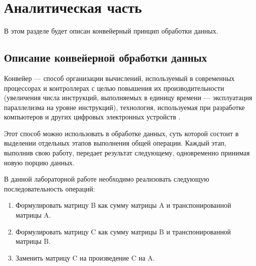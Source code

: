 \chapter{Аналитическая часть}
В этом разделе будет описан конвейерный принцип обработки данных.

\section{Описание конвейерной обработки данных}

Конвейер — способ организации вычислений, используемый в современных процессорах и контроллерах с целью повышения их производительности (увеличения числа инструкций, выполняемых в единицу времени — эксплуатация параллелизма на уровне инструкций), технология, используемая при разработке компьютеров и других цифровых электронных устройств \cite{bib1}.

Этот способ можно использовать в обработке данных, суть которой состоит в выделении отдельных этапов выполнения общей операции.
Каждый этап, выполнив свою работу, передает результат следующему, одновременно принимая новую порцию данных.

В данной лабораторной работе необходимо реализовать следующую последовательность операций:
\begin{enumerate}
    \item Формулировать матрицу B как сумму матрицы A и транспонированной матрицы A.
    \item Формулировать матрицу C как сумму матрицы B и транспонированной матрицы B.
    \item Заменить матрицу C на произведение C на A.
\end{enumerate}